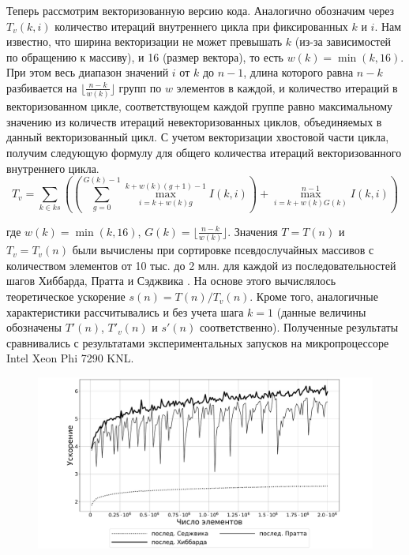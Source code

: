 Теперь рассмотрим векторизованную версию кода. 
Аналогично обозначим через $T_v(k,i)$ количество итераций внутреннего цикла при фиксированных $k$ и $i$. 
Нам известно, что ширина векторизации не может превышать $k$ (из-за зависимостей по обращению к массиву), и 16 (размер вектора), то есть $w(k) = \min(k, 16)$. 
При этом весь диапазон значений $i$ от $k$ до $n - 1$, длина которого равна $n - k$ разбивается на $\lfloor \frac{n - k}{w(k)} \rfloor$ групп по $w$ элементов в каждой, и количество итераций в векторизованном цикле, соответствующем каждой группе равно максимальному значению из количеств итераций невекторизованных циклов, объединяемых в данный векторизованный цикл. 
С учетом векторизации хвостовой части цикла, получим следующую формулу для общего количества итераций векторизованного внутреннего цикла.
\begin{equation}
	T_v = \sum_{k \in ks}
	{
		\left(
			\left(
				\sum_{g = 0}^{G(k) - 1}{\max_{i = k + w(k)g}^{k + w(k)(g + 1) - 1}{I(k, i)}}
			\right)
			+ \max_{i = k + w(k)G(k)}^{n - 1}{I(k, i)}
		\right)
	}
\end{equation}

где $w(k) = \min(k, 16)$, $G(k) = \lfloor \frac{n - k}{w(k)} \rfloor$. 
Значения $T = T(n)$ и $T_v = T_v(n)$ были вычислены при сортировке псевдослучайных массивов с количеством элементов от 10 тыс. до 2 млн. для каждой из последовательностей шагов Хиббарда, Пратта и Сэджвика \cite{Pratt_seq,Hib_seq,Sedjw_seq}. 
На основе этого вычислялось теоретическое ускорение $s(n) = T(n)/T_v(n)$. 
Кроме того, аналогичные характеристики рассчитывались и без учета шага $k = 1$ (данные величины обозначены $T'(n)$, $T'_v(n)$ и $s'(n)$ соответственно). 
Полученные результаты сравнивались с результатами экспериментальных запусков на микропроцессоре Intel Xeon Phi 7290 KNL.

\begin{figure}[ht]
	\centering
		\includegraphics[width=1.0\textwidth]{./pics/text_4_vec_irreg/theoretical_eff.pdf}
	\caption{}
	\label{fig:text_4_vec_irreg_theoretical_eff}
\end{figure}

